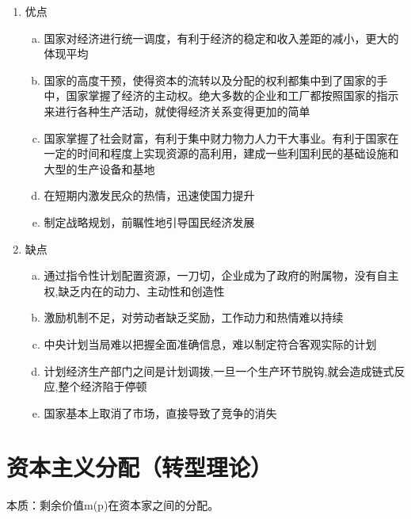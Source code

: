 \documentclass[12pt]{book}
\begin{document}
\begin{enumerate}[1.]
\begin{enumerate}[(1)]
              \item 优点
                    \begin{enumerate}[a.]
                        \item 国家对经济进行统一调度，有利于经济的稳定和收入差距的减小，更大的体现平均
                        \item 国家的高度干预，使得资本的流转以及分配的权利都集中到了国家的手中，国家掌握了经济的主动权。绝大多数的企业和工厂都按照国家的指示来进行各种生产活动，就使得经济关系变得更加的简单
                        \item 国家掌握了社会财富，有利于集中财力物力人力干大事业。有利于国家在一定的时间和程度上实现资源的高利用，建成一些利国利民的基础设施和大型的生产设备和基地
                        \item 在短期内激发民众的热情，迅速使国力提升
                        \item 制定战略规划，前瞩性地引导国民经济发展
                    \end{enumerate}
              \item 缺点
                    \begin{enumerate}[a.]
                        \item 通过指令性计划配置资源，一刀切，企业成为了政府的附属物，没有自主权,缺乏内在的动力、主动性和创造性
                        \item 激励机制不足，对劳动者缺乏奖励，工作动力和热情难以持续
                        \item 中央计划当局难以把握全面准确信息，难以制定符合客观实际的计划
                        \item 计划经济生产部门之间是计划调拨,一旦一个生产环节脱钩,就会造成链式反应,整个经济陷于停顿
                        \item 国家基本上取消了市场，直接导致了竞争的消失
                    \end{enumerate}

          \end{enumerate}
\end{enumerate}






\section{资本主义分配（转型理论）}


本质：剩余价值m(p)在资本家之间的分配。
\\
\end{document}

